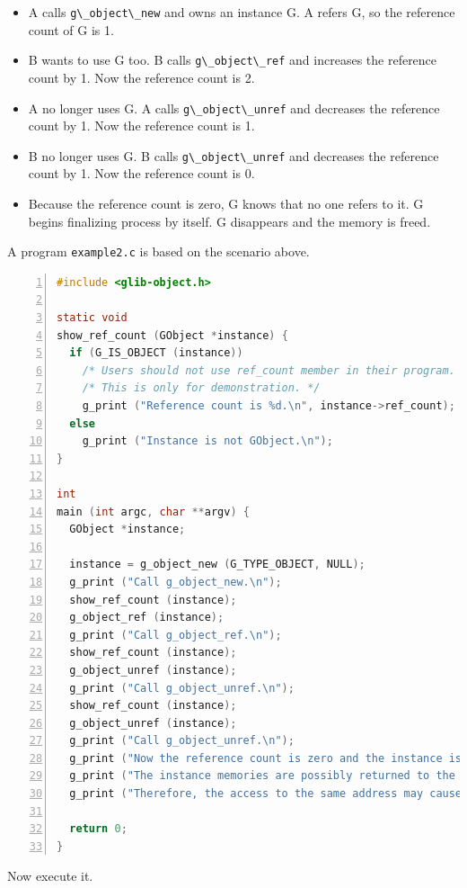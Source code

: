 \begin{itemize}
\tightlist
\item
  A calls \passthrough{\lstinline!g\_object\_new!} and owns an instance
  G. A refers G, so the reference count of G is 1.
\item
  B wants to use G too. B calls \passthrough{\lstinline!g\_object\_ref!}
  and increases the reference count by 1. Now the reference count is 2.
\item
  A no longer uses G. A calls \passthrough{\lstinline!g\_object\_unref!}
  and decreases the reference count by 1. Now the reference count is 1.
\item
  B no longer uses G. B calls \passthrough{\lstinline!g\_object\_unref!}
  and decreases the reference count by 1. Now the reference count is 0.
\item
  Because the reference count is zero, G knows that no one refers to it.
  G begins finalizing process by itself. G disappears and the memory is
  freed.
\end{itemize}

A program \passthrough{\lstinline!example2.c!} is based on the scenario
above.

\begin{lstlisting}[language=C, numbers=left]
#include <glib-object.h>

static void
show_ref_count (GObject *instance) {
  if (G_IS_OBJECT (instance))
    /* Users should not use ref_count member in their program. */
    /* This is only for demonstration. */
    g_print ("Reference count is %d.\n", instance->ref_count);
  else
    g_print ("Instance is not GObject.\n");
}

int
main (int argc, char **argv) {
  GObject *instance;
  
  instance = g_object_new (G_TYPE_OBJECT, NULL);
  g_print ("Call g_object_new.\n");
  show_ref_count (instance);
  g_object_ref (instance);
  g_print ("Call g_object_ref.\n");
  show_ref_count (instance);
  g_object_unref (instance);
  g_print ("Call g_object_unref.\n");
  show_ref_count (instance);
  g_object_unref (instance);
  g_print ("Call g_object_unref.\n");
  g_print ("Now the reference count is zero and the instance is destroyed.\n");
  g_print ("The instance memories are possibly returned to the system.\n");
  g_print ("Therefore, the access to the same address may cause a segmentation error.\n");
  
  return 0;
}
\end{lstlisting}

Now execute it.

